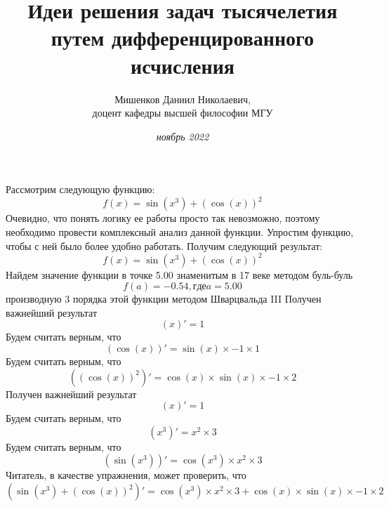 \documentclass{article}
\title{\textbf {Идеи решения задач тысячелетия путем дифференцированного исчисления}}
\author{Мишенков Даниил Николаевич,\\
		доцент кафедры высшей философии МГУ}
\date{\textit {\normalsize {ноябрь 2022}}}
\begin{document}
\maketitle
\section {}
Рассмотрим следующую функцию:\newline
\[f(x) = \sin( x ^{ 3 })+(\cos( x ))^{ 2 }\]\newline
Очевидно, что понять логику ее работы просто так невозможно, поэтому необходимо провести комплексный анализ данной функции.\newline\newline
Упростим функцию, чтобы с ней было более удобно работать.\newline
Получим следующий результат:\newline\newline
\[f(x) = \sin( x ^{ 3 })+(\cos( x ))^{ 2 }\]\newline
Найдем значение функции в точке 5.00 знаменитым в 17 веке методом буль-буль\newline\[f(a) = -0.54, где a = 5.00\] производную 3 порядка этой функции методом Шварцвальда III\newline
Получен важнейший результат\newline
\[( x )' =  1 \]\newline
Будем считать верным, что\newline
\[(\cos( x ))' = \sin( x )\times -1 \times 1 \]\newline
Будем считать верным, что\newline
\[((\cos( x ))^{ 2 })' = \cos( x )\times\sin( x )\times -1 \times 2 \]\newline
Получен важнейший результат\newline
\[( x )' =  1 \]\newline
Будем считать верным, что\newline
\[( x ^{ 3 })' =  x ^{ 2 }\times 3 \]\newline
Будем считать верным, что\newline
\[(\sin( x ^{ 3 }))' = \cos( x ^{ 3 })\times x ^{ 2 }\times 3 \]\newline
Читатель, в качестве упражнения, может проверить, что\newline
\[(\sin( x ^{ 3 })+(\cos( x ))^{ 2 })' = \cos( x ^{ 3 })\times x ^{ 2 }\times 3 +\cos( x )\times\sin( x )\times -1 \times 2 \]\newline
\end{document}
